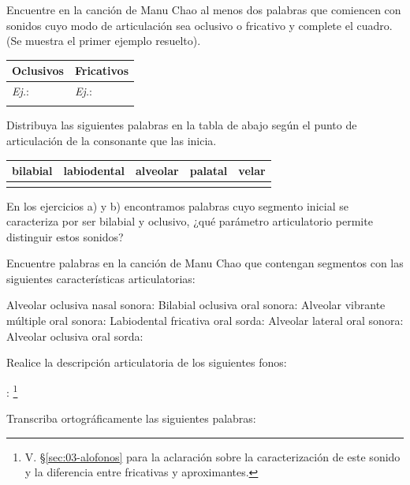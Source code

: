 \begin{ejercicio}\label{ej:03-articulacion}
\begin{consignas}
  \item Encuentre en la canción de Manu Chao al menos dos palabras que comiencen
        con sonidos cuyo modo de articulación sea oclusivo o fricativo y complete
        el cuadro. (Se muestra el primer ejemplo resuelto).

        \begin{tabular}{@{}Y{4cm} Y{4cm}@{}}
          \toprule
          \textbf{Oclusivos} & \textbf{Fricativos} \\
          \midrule
          \textit{Ej.}:  & \textit{Ej.}:  \\
          & \\
          \bottomrule
        \end{tabular}
  \item Distribuya las siguientes palabras en la tabla de abajo según el punto
        de articulación de la consonante que las inicia.

            
          

        \begin{tabular}{@{}*{5}{Y{1.9cm}}@{}}
          \toprule
          \textbf{bilabial} & \textbf{labiodental} & \textbf{alveolar} & \textbf{palatal} & \textbf{velar} \\
          \midrule
           & & & & \\
          \bottomrule
        \end{tabular}
  \item En los ejercicios a) y b) encontramos palabras cuyo segmento inicial se
        caracteriza por ser bilabial y oclusivo, ¿qué parámetro articulatorio
        permite distinguir estos sonidos?
  \item Encuentre palabras en la canción de Manu Chao que contengan segmentos
        con las siguientes características articulatorias:
        \begin{exe}
          \ex Alveolar oclusiva nasal sonora: 
          \ex Bilabial oclusiva oral sonora:
          \ex Alveolar vibrante múltiple oral sonora:
          \ex Labiodental fricativa oral sorda:
          \ex Alveolar lateral oral sonora:
          \ex Alveolar oclusiva oral sorda:
        \end{exe}
  \item Realice la descripción articulatoria de los siguientes fonos:
        \begin{exe}
          \ex {}: \footnote{V. §\ref{sec:03-alofonos} para la aclaración
              sobre la caracterización de este sonido y la diferencia entre
              fricativas y aproximantes.}
          \ex {}
          \ex {}
          \ex {}
          \ex {}
          \ex {}
          \ex {}
        \end{exe}
  \item Transcriba ortográficamente las siguientes palabras:


\end{consignas}
\end{ejercicio}
